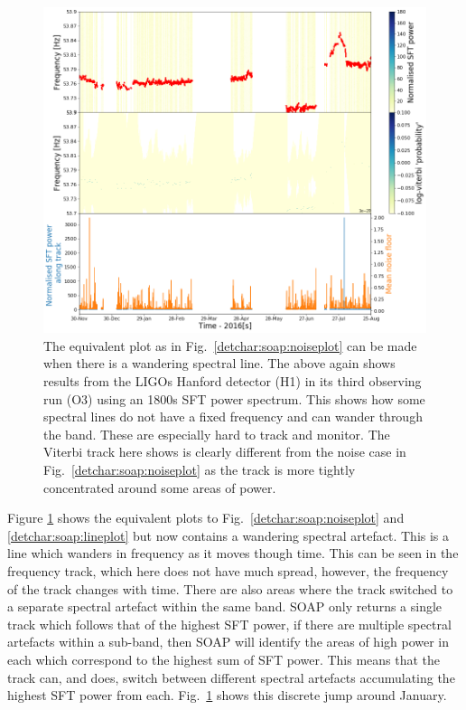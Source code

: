 %
\begin{figure}[hpt]
	\centering
	\includegraphics[width=\textwidth]{C6_detchar/track_F53_7_53_9_wander.png}
        \caption[Example SOAP output for wandering line.]{The equivalent plot
as in Fig.~\ref{detchar:soap:noiseplot} can be made when there is a wandering
spectral line. The above again shows results from the \glspl{LIGO} Hanford detector
(H1) in its third observing run (O3) using an 1800s \gls{SFT} power spectrum. This
shows how some spectral lines do not have a fixed frequency and can wander
through the band. These are especially hard to track and monitor. The Viterbi
track here shows is clearly different from the noise case in
Fig.~\ref{detchar:soap:noiseplot} as the track is more tightly concentrated
around some areas of power. } \label{detchar:soap:wanderplot}

\end{figure}
%

Figure \ref{detchar:soap:wanderplot} shows the equivalent plots to
Fig.~\ref{detchar:soap:noiseplot} and \ref{detchar:soap:lineplot} but now
contains a wandering spectral artefact.  This is
a line which wanders in
frequency as it moves though time.  This can be seen in the frequency
track, which here does not have much spread, however, the frequency of the
track changes with time.  There are also areas where the track switched to a separate spectral artefact within the same
band.  SOAP only returns a single track which follows that of the highest \gls{SFT} power, if there are multiple spectral artefacts within a sub-band, then SOAP will identify the areas of high power in each which correspond to the highest sum of \gls{SFT} power.
This means that the track can, and does, switch between different spectral artefacts accumulating the highest \gls{SFT} power from each.
Fig.~\ref{detchar:soap:wanderplot} shows this discrete jump around
January.

